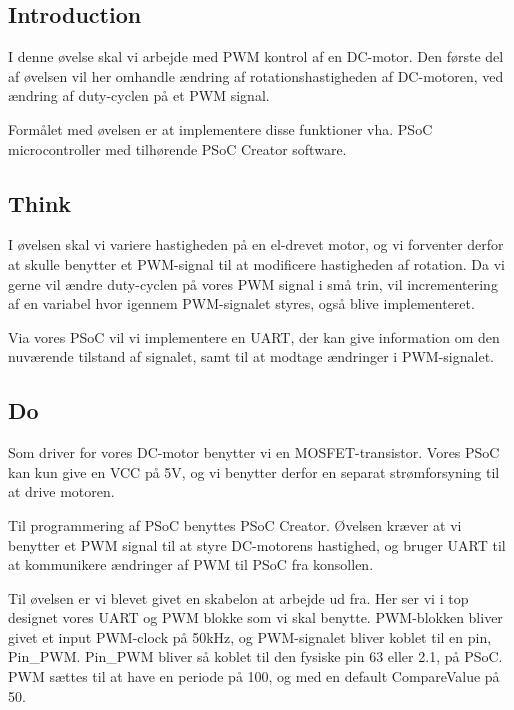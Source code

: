 \documentclass[../main.tex]{subfiles}
\begin{document}
\subsection{Introduction}
I denne øvelse skal vi arbejde med PWM kontrol af en DC-motor. Den første del af øvelsen vil her omhandle ændring af rotationshastigheden af DC-motoren, ved ændring af duty-cyclen på et PWM signal.

Formålet med øvelsen er at implementere disse funktioner vha. PSoC microcontroller med tilhørende PSoC Creator software. 

\subsection{Think}
I øvelsen skal vi variere hastigheden på en el-drevet motor, og vi forventer derfor at skulle benytter et PWM-signal til at modificere hastigheden af rotation. Da vi gerne vil ændre duty-cyclen på vores PWM signal i små trin, vil incrementering af en variabel hvor igennem PWM-signalet styres, også blive implementeret.

Via vores PSoC vil vi implementere en UART, der kan give information om den nuværende tilstand af signalet, samt til at modtage ændringer i PWM-signalet.

\subsection{Do}
Som driver for vores DC-motor benytter vi en MOSFET-transistor. Vores PSoC kan kun give en VCC på 5V, og vi benytter derfor en separat strømforsyning til at drive motoren.


Til programmering af PSoC benyttes PSoC Creator. Øvelsen kræver at vi benytter et PWM signal til at styre DC-motorens hastighed, og bruger UART til at kommunikere ændringer af PWM til PSoC fra konsollen.

Til øvelsen er vi blevet givet en skabelon at arbejde ud fra. Her ser vi i top designet vores UART og PWM blokke som vi skal benytte. PWM-blokken bliver givet et input PWM-clock på 50kHz, og PWM-signalet bliver koblet til en pin, Pin\_PWM. Pin\_PWM bliver så koblet til den fysiske pin 63 eller 2.1, på PSoC. PWM sættes til at have en periode på 100, og med en default CompareValue på 50.

\end{document}
